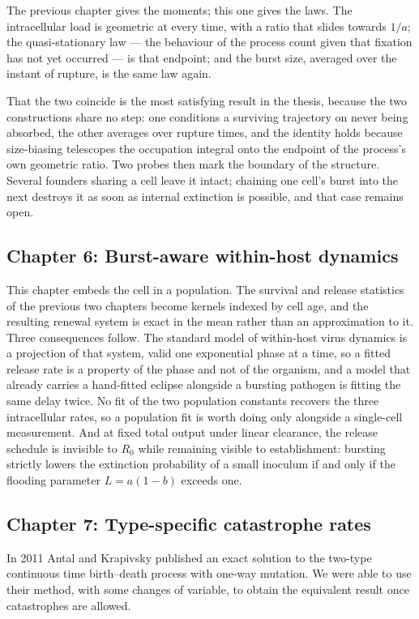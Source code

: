 The previous chapter gives the moments; this one gives the laws. The
intracellular load is geometric at every time, with a ratio that slides towards
$1/a$; the quasi-stationary law --- the behaviour of the process count given
that fixation has not yet occurred --- is that endpoint; and the burst size,
averaged over the instant of rupture, is the same law again.

That the two coincide is the most satisfying result in the thesis, because the
two constructions share no step: one conditions a surviving trajectory on never
being absorbed, the other averages over rupture times, and the identity holds
because size-biasing telescopes the occupation integral onto the endpoint of
the process's own geometric ratio. Two probes then mark the boundary of the
structure. Several founders sharing a cell leave it intact; chaining one cell's
burst into the next destroys it as soon as internal extinction is possible, and
that case remains open.

\subsection*{Chapter 6: Burst-aware within-host dynamics}

This chapter embeds the cell in a population. The survival and release
statistics of the previous two chapters become kernels indexed by cell age, and
the resulting renewal system is exact in the mean rather than an approximation
to it. Three consequences follow. The standard model of within-host virus
dynamics is a projection of that system, valid one exponential phase at a time,
so a fitted release rate is a property of the phase and not of the organism,
and a model that already carries a hand-fitted eclipse alongside a bursting
pathogen is fitting the same delay twice. No fit of the two population
constants recovers the three intracellular rates, so a population fit is worth
doing only alongside a single-cell measurement. And at fixed total output under
linear clearance, the release schedule is invisible to $R_0$ while remaining
visible to establishment: bursting strictly lowers the extinction probability
of a small inoculum if and only if the flooding parameter $L=a(1-b)$ exceeds
one.

\subsection*{Chapter 7: Type-specific catastrophe rates}

In 2011 Antal and Krapivsky \cite{antal2011exact} published an exact solution
to the two-type continuous time birth--death process with one-way mutation. We
were able to use their method, with some changes of variable, to obtain the
equivalent result once catastrophes are allowed.

